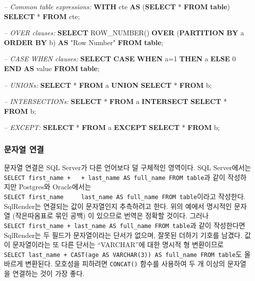 \documentclass[10.5pt]{book}
\newenvironment{Shaded}{\begin{snugshade}}{\end{snugshade}}
\newcommand{\KeywordTok}[1]{\textcolor[rgb]{0.13,0.29,0.53}{\textbf{#1}}}
\newcommand{\DecValTok}[1]{\textcolor[rgb]{0.00,0.00,0.81}{#1}}
\newcommand{\CommentTok}[1]{\textcolor[rgb]{0.56,0.35,0.01}{\textit{#1}}}
\newcommand{\OtherTok}[1]{\textcolor[rgb]{0.56,0.35,0.01}{#1}}
\newcommand{\FunctionTok}[1]{\textcolor[rgb]{0.00,0.00,0.00}{#1}}
\newcommand{\NormalTok}[1]{#1}
\theoremstyle{definition}
\theoremstyle{definition}
\theoremstyle{definition}
\theoremstyle{remark}
\begin{document}
\begin{Shaded}
\begin{Highlighting}[]
\CommentTok{-- Common table expressions:}
\KeywordTok{WITH}\NormalTok{ cte }\KeywordTok{AS}\NormalTok{ (}\KeywordTok{SELECT}\NormalTok{ * }\KeywordTok{FROM} \KeywordTok{table}\NormalTok{) }\KeywordTok{SELECT}\NormalTok{ * }\KeywordTok{FROM}\NormalTok{ cte;}

\CommentTok{-- OVER clauses:}
\KeywordTok{SELECT} \FunctionTok{ROW_NUMBER}\NormalTok{() }\KeywordTok{OVER}\NormalTok{ (}\KeywordTok{PARTITION} \KeywordTok{BY}\NormalTok{ a }\KeywordTok{ORDER} \KeywordTok{BY}\NormalTok{ b)}
  \KeywordTok{AS} \OtherTok{"Row Number"} \KeywordTok{FROM} \KeywordTok{table}\NormalTok{;}

\CommentTok{-- CASE WHEN clauses:}
\KeywordTok{SELECT} \KeywordTok{CASE} \KeywordTok{WHEN}\NormalTok{ a=}\DecValTok{1} \KeywordTok{THEN}\NormalTok{ a }\KeywordTok{ELSE} \DecValTok{0} \KeywordTok{END} \KeywordTok{AS} \FunctionTok{value} \KeywordTok{FROM} \KeywordTok{table}\NormalTok{;}

\CommentTok{-- UNIONs:}
\KeywordTok{SELECT}\NormalTok{ * }\KeywordTok{FROM}\NormalTok{ a }\KeywordTok{UNION} \KeywordTok{SELECT}\NormalTok{ * }\KeywordTok{FROM}\NormalTok{ b;}

\CommentTok{-- INTERSECTIONs:}
\KeywordTok{SELECT}\NormalTok{ * }\KeywordTok{FROM}\NormalTok{ a }\KeywordTok{INTERSECT} \KeywordTok{SELECT}\NormalTok{ * }\KeywordTok{FROM}\NormalTok{ b;}

\CommentTok{-- EXCEPT:}
\KeywordTok{SELECT}\NormalTok{ * }\KeywordTok{FROM}\NormalTok{ a }\KeywordTok{EXCEPT} \KeywordTok{SELECT}\NormalTok{ * }\KeywordTok{FROM}\NormalTok{ b;}
\end{Highlighting}
\end{Shaded}

\subsubsection*{문자열 연결}\label{-}

문자열 연결은 SQL Server가 다른 언어보다 덜 구체적인 영역이다. SQL
Server에서는
\texttt{SELECT\ first\_name\ +\ \textquotesingle{}\ \textquotesingle{}\ +\ last\_name\ AS\ full\_name\ FROM\ table}과
같이 작성하지만 Postgres와 Oracle에서는
\texttt{SELECT\ first\_name\ \textbar{}\textbar{}\ \textquotesingle{}\ \textquotesingle{}\ \textbar{}\textbar{}\ last\_name\ AS\ full\_name\ FROM\ table}이라고
작성한다. SqlRender는 연결되는 값이 문자열인지 추측하려고 한다. 위의
예에서 명시적인 문자열 (작은따옴표로 묶인 공백) 이 있으므로 번역은
정확할 것이다. 그러나
\texttt{SELECT\ first\_name\ +\ last\_name\ AS\ full\_name\ FROM\ table}과
같이 작성한다면 SqlRender는 두 필드가 문자열이라는 단서가 없으며, 잘못된
더하기 기호를 남겼다. 값이 문자열이라는 또 다른 단서는 ``VARCHAR''에
대한 명시적 형 변환이므로
\texttt{SELECT\ last\_name\ +\ CAST(age\ AS\ VARCHAR(3))\ AS\ full\_name\ FROM\ table}도
올바르게 변환된다. 모호성을 피하려면 \texttt{CONCAT()} 함수를 사용하여
두 개 이상의 문자열을 연결하는 것이 가장 좋다.
\end{document}
